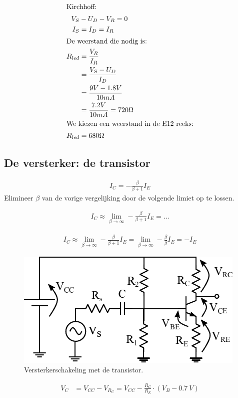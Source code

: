 \documentclass{exam}
\begin{document}
\begin{questions}
			\begin{solutionordottedlines}[1in]
				\begin{align*}
					\intertext{Kirchhoff:}
						V_S &- U_D - V_R = 0 \\
						I_S &= I_D = I_R \\
					\intertext{De weerstand die nodig is:}	
					    R_{led} &= \frac{V_R}{I_R} \\
					    		&= \frac{V_S-U_D}{I_D} \\
					    		&= \frac{9V-1.8V}{10mA} \\
					    		&= \frac{7.2V}{10mA} = 720 \Omega \\
					\intertext{We kiezen een weerstand in de E12 reeks:}
					    R_{led} &= 680 \Omega
				\end{align*}
			\end{solutionordottedlines}

\subsection{De versterker: de transistor}
		\question
			\begin{align}
					    I_C = -\frac{\beta}{\beta+1}I_E
			\end{align}
			Elimineer $\beta$ van de vorige vergelijking door de volgende limiet op te lossen.

			\begin{align*}
			    I_C \approx \lim_{\beta \rightarrow \infty} -\frac{\beta}{\beta+1}I_E = \ldots
			\end{align*}
			
			\begin{solutionordottedlines}[1in]

				\begin{align*}
					I_C \approx \lim_{\beta \rightarrow \infty} -\frac{\beta}{\beta+1}I_E = \lim_{\beta \rightarrow \infty} -\frac{\beta}{\beta}I_E = -I_E
				\end{align*}
			
			\end{solutionordottedlines}


		\question
			\begin{figure}[htbp]
				\centering
				\includegraphics{ges}
				\caption{Versterkerschakeling met de transistor.}
				\label{fig:ges}
			\end{figure}
			\begin{align}
				V_C &= V_{CC} - V_{R_C} = V_{CC} - \frac{R_C}{R_E} \cdot (V_B - 0.7~V)
				\label{eq:versterking}
			\end{align}		


\end{questions}
\end{document}
